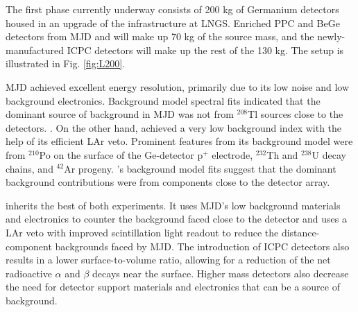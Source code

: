 The first phase currently underway consists of 200 kg of Germanium detectors housed in an upgrade of the {\Gerda} infrastructure at LNGS. Enriched PPC and BeGe detectors from MJD and {\Gerda} will make up 70 kg of the source mass, and the newly-manufactured ICPC detectors will make up the rest of the 130 kg. The setup is illustrated in Fig. \ref{fig:L200}. 

MJD achieved excellent energy resolution, primarily due to its low noise and low background electronics. Background model spectral fits indicated that the dominant source of background in MJD was not from $^{208}$Tl sources close to the detectors. \cite{Buuck_thesis}. On the other hand, {\Gerda} achieved a very low background index with the help of its efficient LAr veto. Prominent features from its background model were from $^{210}$Po on the surface of the Ge-detector p$^+$ electrode, $^{232}$Th and $^{238}$U decay chains, and $^{42}$Ar progeny. {\Gerda}'s background model fits suggest that the dominant background contributions \cite{GERDA_final} were from components close to the detector array.

{\Ltwo} inherits the best of both experiments. It uses MJD's low background materials and electronics to counter the background {\Gerda} faced close to the detector and uses a LAr veto with improved scintillation light readout to reduce the distance-component backgrounds faced by MJD. The introduction of ICPC detectors also results in a lower surface-to-volume ratio, allowing for a reduction of the net radioactive $\alpha$ and $\beta$ decays near the surface. Higher mass detectors also decrease the need for detector support materials and electronics that can be a source of background. 

